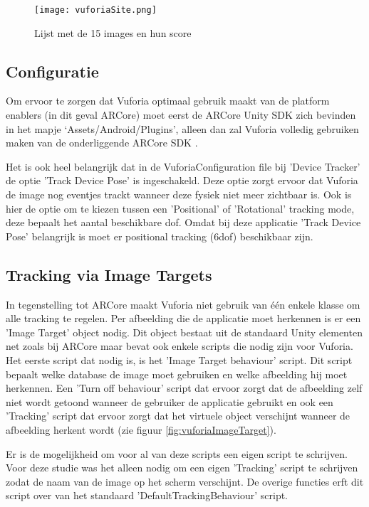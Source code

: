 \begin{figure}
    \texttt{[image: vuforiaSite.png]}
    \caption{Lijst met de 15 images en hun score}
    \label{fig:vuforiaDatabase}
\end{figure}

\subsection{Configuratie}
Om ervoor te zorgen dat Vuforia optimaal gebruik maakt van de platform enablers (in dit geval ARCore) moet eerst de ARCore Unity SDK zich bevinden in het mapje `Assets/Android/Plugins', alleen dan zal Vuforia volledig gebruiken maken van de onderliggende ARCore SDK \autocite{VuforiaARCore}.

Het is ook heel belangrijk dat in de VuforiaConfiguration file bij 'Device Tracker' de optie 'Track Device Pose' is ingeschakeld. Deze optie zorgt ervoor dat Vuforia de image nog eventjes trackt wanneer deze fysiek niet meer zichtbaar is. Ook is hier de optie om te kiezen tussen een 'Positional' of 'Rotational' tracking mode, deze bepaalt het aantal beschikbare \acrlong{dof}. Omdat bij deze applicatie 'Track Device Pose' belangrijk is moet er positional tracking (\acrshort{6dof}) beschikbaar zijn.

\subsection{Tracking via Image Targets}
In tegenstelling tot ARCore maakt Vuforia niet gebruik van één enkele klasse om alle tracking te regelen. Per afbeelding die de applicatie moet herkennen is er een 'Image Target' object nodig. Dit object bestaat uit de standaard Unity elementen net zoals bij ARCore maar bevat ook enkele scripts die nodig zijn voor Vuforia. Het eerste script dat nodig is, is het 'Image Target behaviour' script. Dit script bepaalt welke database de image moet gebruiken en welke afbeelding hij moet herkennen. Een 'Turn off behaviour' script dat ervoor zorgt dat de afbeelding zelf niet wordt getoond wanneer de gebruiker de applicatie gebruikt en ook een 'Tracking' script dat ervoor zorgt dat het virtuele object verschijnt wanneer de afbeelding herkent wordt (zie figuur \ref{fig:vuforiaImageTarget}). 

Er is de mogelijkheid om voor al van deze scripts een eigen script te schrijven. Voor deze studie was het alleen nodig om een eigen 'Tracking' script te schrijven zodat de naam van de image op het scherm verschijnt. De overige functies erft dit script over van het standaard 'DefaultTrackingBehaviour' script.

